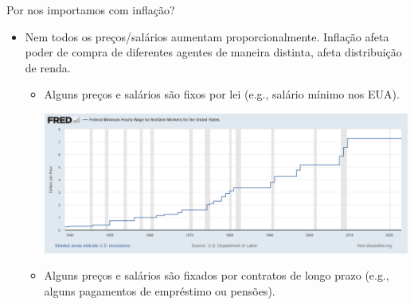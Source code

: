 \documentclass[10pt]{beamer}
\begin{document}
\begin{frame}{Por nos importamos com inflação?}
    \begin{itemize}
        \item Nem todos os preços/salários aumentam proporcionalmente. Inflação afeta poder de compra de diferentes agentes de maneira distinta, afeta distribuição de renda.\medskip
        \begin{itemize}
            \item Alguns preços e salários são fixos por lei (e.g., salário mínimo nos EUA).        
        \begin{center}
            \begin{minipage}[b]{.8\textwidth}
                \href{https://fred.stlouisfed.org/series/FEDMINNFRWG}{\includegraphics[width=\textwidth]{./figures/minimum wage.png}}            
            \end{minipage}
        \end{center}
    \item Alguns preços e salários são fixados por contratos de longo prazo (e.g., alguns pagamentos de empréstimo ou pensões).
    \end{itemize}
    \end{itemize}
\end{frame}
\end{document}

